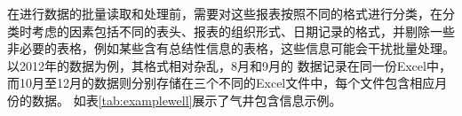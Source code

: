 在进行数据的批量读取和处理前，需要对这些报表按照不同的格式进行分类，在分类时考虑的因素包括不同的表头、报表的组织形式、日期记录的格式，并剔除一些非必要的表格，例如某些含有总结性信息的表格，这些信息可能会干扰批量处理。以2012年的数据为例，其格式相对杂乱，8月和9月的
数据记录在同一份Excel中，而10月至12月的数据则分别存储在三个不同的Excel文件中，每个文件包含相应月份的数据。
如表\ref{tab:examplewell}展示了气井包含信息示例。

